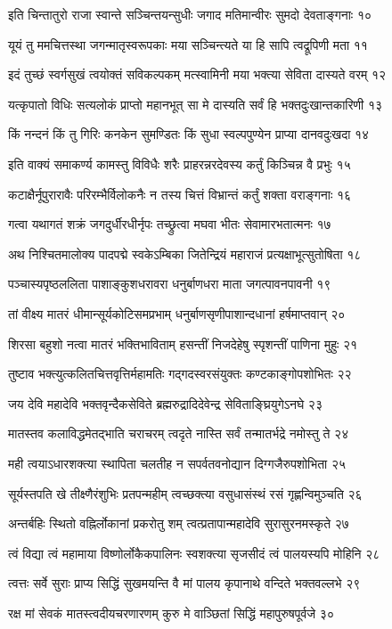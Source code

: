 इति चिन्तातुरो राजा स्वान्ते सञ्चिन्तयन्सुधीः
जगाद मतिमान्वीरः सुमदो देवताङ्गनाः १०

यूयं तु ममचित्तस्था जगन्मातृस्वरूपकाः
मया सञ्चिन्त्यते या हि सापि त्वद्रूपिणी मता ११

इदं तुच्छं स्वर्गसुखं त्वयोक्तं सविकल्पकम्
मत्स्वामिनी मया भक्त्या सेविता दास्यते वरम् १२

यत्कृपातो विधिः सत्यलोकं प्राप्तो महानभूत्
सा मे दास्यति सर्वं हि भक्तदुःखान्तकारिणी १३

किं नन्दनं किं तु गिरिः कनकेन सुमण्डितः
किं सुधा स्वल्पपुण्येन प्राप्या दानवदुःखदा १४

इति वाक्यं समाकर्ण्य कामस्तु विविधैः शरैः
प्राहरन्नरदेवस्य कर्तुं किञ्चिन्न वै प्रभुः १५

कटाक्षैर्नूपुरारावैः परिरम्भैर्विलोकनैः
न तस्य चित्तं विभ्रान्तं कर्तुं शक्ता वराङ्गनाः १६

गत्वा यथागतं शक्रं जगदुर्धीरधीर्नृपः
तच्छ्रुत्वा मघवा भीतः सेवामारभतात्मनः १७

अथ निश्चितमालोक्य पादपद्मे स्वकेऽम्बिका
जितेन्द्रियं महाराजं प्रत्यक्षाभूत्सुतोषिता १८

पञ्चास्यपृष्ठललिता पाशाङ्कुशधरावरा
धनुर्बाणधरा माता जगत्पावनपावनी १९

तां वीक्ष्य मातरं धीमान्सूर्यकोटिसमप्रभाम्
धनुर्बाणसृणीपाशान्दधानां हर्षमाप्तवान् २०

शिरसा बहुशो नत्वा मातरं भक्तिभाविताम्
हसन्तीं निजदेहेषु स्पृशन्तीं पाणिना मुहुः २१

तुष्टाव भक्त्युत्कलितचित्तवृत्तिर्महामतिः
गद्गदस्वरसंयुक्तः कण्टकाङ्गोपशोभितः २२

जय देवि महादेवि भक्तवृन्दैकसेविते
ब्रह्मरुद्रादिदेवेन्द्र सेविताङ्घ्रियुगेऽनघे २३

मातस्तव कलाविद्धमेतद्भाति चराचरम्
त्वदृते नास्ति सर्वं तन्मातर्भद्रे नमोस्तु ते २४

मही त्वयाऽधारशक्त्या स्थापिता चलतीह न
सपर्वतवनोद्यान दिग्गजैरुपशोभिता २५

सूर्यस्तपति खे तीक्ष्णैरंशुभिः प्रतपन्महीम्
त्वच्छक्त्या वसुधासंस्थं रसं गृह्णन्विमुञ्चति २६

अन्तर्बहिः स्थितो वह्निर्लोकानां प्रकरोतु शम्
त्वत्प्रतापान्महादेवि सुरासुरनमस्कृते २७

त्वं विद्या त्वं महामाया विष्णोर्लोकैकपालिनः
स्वशक्त्या सृजसीदं त्वं पालयस्यपि मोहिनि २८

त्वत्तः सर्वे सुराः प्राप्य सिद्धिं सुखमयन्ति वै
मां पालय कृपानाथे वन्दिते भक्तवल्लभे २९

रक्ष मां सेवकं मातस्त्वदीयचरणारणम्
कुरु मे वाञ्छितां सिद्धिं महापुरुषपूर्वजे ३०

